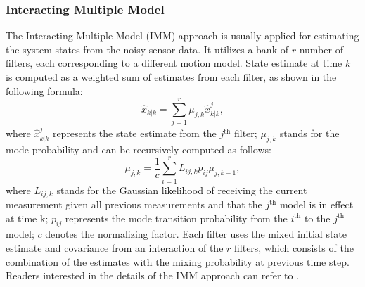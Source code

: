 \documentclass[journal]{IEEEtran}
\begin{document}
	\subsubsection{Interacting Multiple Model}\label{subsec:imm}
	
	The Interacting Multiple Model (IMM) approach is usually applied for estimating the system states from the noisy sensor data.
	It utilizes a bank of $r$ number of filters, each corresponding to a different motion model.
	State estimate at time $k$ is computed as a weighted sum of estimates from each filter, as shown in the following formula:
	\begin{equation}
		\hat{x}_{k|k}=\sum\limits_{j=1}^{r}\mu_{j,k}\hat{x}^j_{k|k}, \label{eqn:imm_eq}
	\end{equation}\normalsize 
	where $\hat{x}^j_{k|k}$ represents the state estimate from the $j^\text{th}$ filter; $\mu_{j,k}$ stands for the mode probability and can be recursively computed as follows:
	\[
	\mu_{j,k}=\frac{1}{c}\sum\limits_{i=1}^{r}L_{ij,k}p_{ij}\mu_{j,k-1},
	\]\normalsize
	where $L_{ij,k}$ stands for the Gaussian likelihood of receiving the current measurement given all previous measurements and that the $j^\text{th}$ model is in effect at time k; $p_{ij}$ represents the mode transition probability from the $i^\text{th}$ to the $j^\text{th}$ model; $c$ denotes the normalizing factor. 
	Each filter uses the mixed initial state estimate and covariance from an interaction of the $r$ filters, which consists of the combination of the estimates with the mixing probability at previous time step.
	Readers interested in the details of the IMM approach can refer to \cite{yaakov2001estimation}.
	
\end{document}
